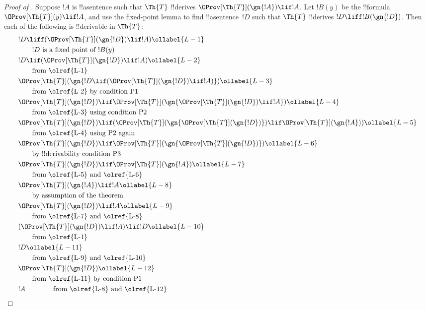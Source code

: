 \documentclass[../../../include/open-logic-section]{subfiles}
\begin{document}
\begin{proof}[Proof of ]
Suppose $!A$ is !!a{sentence} such that $\Th{T}$ !!{derive}s
$\OProv[\Th{T}](\gn{!A}) \lif !A$. Let $!B(y)$ be the !!{formula}~$\OProv[\Th{T}](y)
\lif !A$, and use the fixed-point lemma to find !!a{sentence}~$!D$
such that $\Th{T}$ !!{derive}s $!D \liff !B(\gn{!D})$. Then each of the
following is !!{derivable} in $\Th{T}$:
\begin{align}
  & !D \liff (\OProv[\Th{T}](\gn{!D}) \lif !A) \ollabel{L-1}\\
  & \qquad \text{$!D$ is a fixed point of~$!B(y)$}\notag \\
  & !D \lif (\OProv[\Th{T}](\gn{!D}) \lif !A) \ollabel{L-2}\\
  & \qquad\text{from \olref{L-1}}\notag\\
  & \OProv[\Th{T}](\gn{!D \lif (\OProv[\Th{T}](\gn{!D}) \lif !A)}) \ollabel{L-3}\\
  & \qquad \text{from \olref{L-2} by condition P1}\notag \\
  & \OProv[\Th{T}](\gn{!D}) \lif \OProv[\Th{T}](\gn{\OProv[\Th{T}](\gn{!D}) \lif !A})
  \ollabel{L-4}\\
  &\qquad \text{from \olref{L-3} using condition P2}\notag \\
  & \OProv[\Th{T}](\gn{!D}) \lif (\OProv[\Th{T}](\gn{\OProv[\Th{T}](\gn{!D})}) \lif \OProv[\Th{T}](\gn{!A})) \ollabel{L-5}\\
  &\qquad \text{from \olref{L-4} using P2 again} \notag\\
& \OProv[\Th{T}](\gn{!D}) \lif \OProv[\Th{T}](\gn{\OProv[\Th{T}](\gn{!D})}) \ollabel{L-6}\\
  & \qquad\text{by !!{derivability} condition P3} \notag\\
  & \OProv[\Th{T}](\gn{!D}) \lif \OProv[\Th{T}](\gn{!A}) \ollabel{L-7} \\
  &\qquad\text{from \olref{L-5} and \olref{L-6}}\notag\\
  & \OProv[\Th{T}](\gn{!A}) \lif !A \ollabel{L-8}\\
  &\qquad\text{by assumption of the theorem} \notag\\
  & \OProv[\Th{T}](\gn{!D}) \lif !A \ollabel{L-9}\\
  &\qquad\text{from \olref{L-7} and \olref{L-8}}\notag\\
  & (\OProv[\Th{T}](\gn{!D}) \lif !A) \lif !D \ollabel{L-10}\\
  & \qquad \text{from \olref{L-1}}\notag \\
  & !D \ollabel{L-11}\\
  & \qquad\text{from \olref{L-9} and \olref{L-10}}\notag \\
  & \OProv[\Th{T}](\gn{!D}) \ollabel{L-12}\\
  & \qquad\text{from \olref{L-11} by condition~P1}\notag \\
  & !A \qquad\qquad\text{from \olref{L-8} and \olref{L-12}}\notag
\end{align}
\end{proof}
\end{document}
